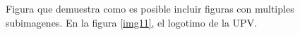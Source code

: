 \documentclass[conference]{IEEEtran}
\begin{document}
\begin{figure}
\\
\\
\caption{Figura que demuestra como es posible incluir figuras con multiples subimagenes. En la figura \ref{img11}, el logotimo de la UPV. }
\label{fig:r2c_exp}
\end{figure}
\end{document}
